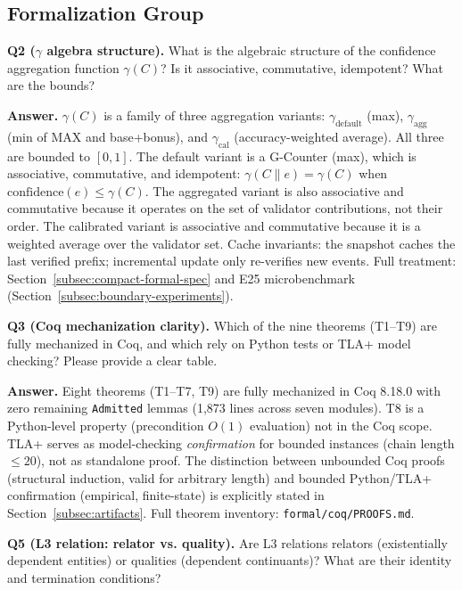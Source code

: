 \subsection{Formalization Group}\label{subsec:response-formalization}

\textbf{Q2 ($\gamma$ algebra structure).} What is the algebraic structure of the confidence aggregation function $\gamma(C)$? Is it associative, commutative, idempotent? What are the bounds?

\textbf{Answer.} $\gamma(C)$ is a family of three aggregation variants: $\gamma_{\text{default}}$ (max), $\gamma_{\text{agg}}$ (min of MAX and base+bonus), and $\gamma_{\text{cal}}$ (accuracy-weighted average). All three are bounded to $[0, 1]$. The default variant is a G-Counter (max), which is associative, commutative, and idempotent: $\gamma(C \| e) = \gamma(C)$ when $\text{confidence}(e) \leq \gamma(C)$. The aggregated variant is also associative and commutative because it operates on the set of validator contributions, not their order. The calibrated variant is associative and commutative because it is a weighted average over the validator set. Cache invariants: the snapshot caches the last verified prefix; incremental update only re-verifies new events. Full treatment: Section~\ref{subsec:compact-formal-spec} and E25 microbenchmark (Section~\ref{subsec:boundary-experiments}).

\textbf{Q3 (Coq mechanization clarity).} Which of the nine theorems (T1--T9) are fully mechanized in Coq, and which rely on Python tests or TLA+ model checking? Please provide a clear table.

\textbf{Answer.} Eight theorems (T1--T7, T9) are fully mechanized in Coq 8.18.0 with zero remaining \texttt{Admitted} lemmas (1,873 lines across seven modules). T8 is a Python-level property (precondition $O(1)$ evaluation) not in the Coq scope. TLA+ serves as model-checking \emph{confirmation} for bounded instances (chain length $\leq 20$), not as standalone proof. The distinction between unbounded Coq proofs (structural induction, valid for arbitrary length) and bounded Python/TLA+ confirmation (empirical, finite-state) is explicitly stated in Section~\ref{subsec:artifacts}. Full theorem inventory: \texttt{formal/coq/PROOFS.md}.

\textbf{Q5 (L3 relation: relator vs. quality).} Are L3 relations relators (existentially dependent entities) or qualities (dependent continuants)? What are their identity and termination conditions?

